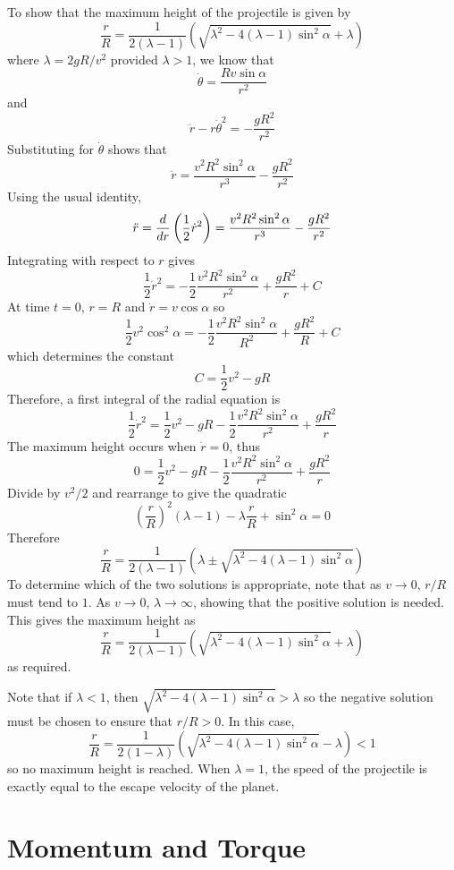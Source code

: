 \begin{example}
To show that the maximum height of the projectile is given by
$$\frac{r}{R}=\frac{1}{2(\lambda-1)}\left(
\sqrt{\lambda^2-4(\lambda-1)\sin^2\alpha}+\lambda\right)$$
where $\lambda=2gR/v^2$ provided $\lambda>1$, we know that
$$\dot{\theta}=\frac{Rv\sin\alpha}{r^2}$$
and
$$\ddot{r}-r\dot{\theta}^2=-\frac{gR^2}{r^2}$$
Substituting for $\dot{\theta}$ shows that
$$\ddot{r}=\frac{v^2R^2\sin^2\alpha}{r^3}-\frac{gR^2}{r^2}$$
Using the usual identity,
$$\ddot{r}=\frac{d}{d{r}}\left(\frac{1}{2}\dot{r}^2\right)=
\frac{v^2R^2\sin^2\alpha}{r^3}-\frac{gR^2}{r^2}$$
Integrating with respect to $r$ gives
$$\frac{1}{2}\dot{r}^2=
-\frac{1}{2}\frac{v^2R^2\sin^2\alpha}{r^2}+\frac{gR^2}{r}+C$$
At time $t=0$, $r=R$ and $\dot{r}=v\cos\alpha$ so
$$\frac{1}{2}v^2\cos^2\alpha=
-\frac{1}{2}\frac{v^2R^2\sin^2\alpha}{R^2}+\frac{gR^2}{R}+C$$
which determines the constant
$$C=\frac{1}{2}v^2-gR$$
Therefore, a first integral of the radial equation is
$$\frac{1}{2}\dot{r}^2=\frac{1}{2}v^2-gR
-\frac{1}{2}\frac{v^2R^2\sin^2\alpha}{r^2}+\frac{gR^2}{r}$$
The maximum height occurs when $\dot{r}=0$, thus
$$0=\frac{1}{2}v^2-gR
-\frac{1}{2}\frac{v^2R^2\sin^2\alpha}{r^2}+\frac{gR^2}{r}$$
Divide by $v^2/2$ and rearrange to give the quadratic
$$\left(\frac{r}{R}\right)^2(\lambda-1)-\lambda\frac{r}{R}+\sin^2\alpha=0$$
Therefore
$$\frac{r}{R}=\frac{1}{2(\lambda-1)}\left(
\lambda\pm\sqrt{\lambda^2-4(\lambda-1)\sin^2\alpha}\right)$$
To determine which of the two solutions is appropriate, note that as
$v\to0$, $r/R$ must tend to $1$.  As $v\to0$, $\lambda\to\infty$,
showing that the positive solution is needed.  This gives the maximum 
height as
$$\frac{r}{R}=\frac{1}{2(\lambda-1)}\left(
\sqrt{\lambda^2-4(\lambda-1)\sin^2\alpha}+\lambda\right)$$
as required.

Note that if $\lambda<1$, then $\sqrt{\lambda^2-4(\lambda-1)\sin^2\alpha}
>\lambda$ so the negative solution must be chosen to ensure that $r/R>0$.
In this case,
$$\frac{r}{R}=\frac{1}{2(1-\lambda)}\left(
\sqrt{\lambda^2-4(\lambda-1)\sin^2\alpha}-\lambda\right)<1$$
so no maximum height is reached.  When $\lambda=1$, the speed of the projectile
is exactly equal to the escape velocity of the planet.
\end{example}


\section{Momentum and Torque}

